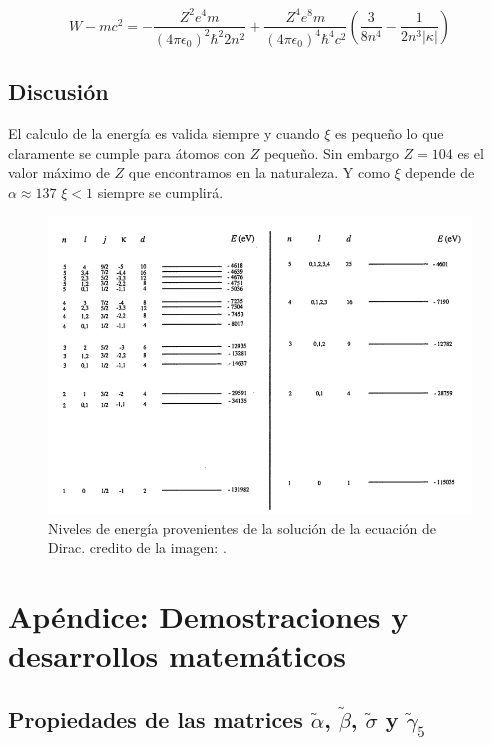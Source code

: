 \documentclass[a4paper, 12pt]{article} %
\begin{document}
\begin{equation}\label{eq:enerWfinal}
W-mc^2 = -\frac{Z^2e^4m}{(4\pi\epsilon_0)^2\hbar^2 2n^2}+\frac{Z^4e^8m}{(4\pi\epsilon_0)^4\hbar^4 c^2} \left( \frac{ 3}{8n^4}-\frac{1}{2n^3|\kappa|} \right)
\end{equation}


\subsection{Discusi\'on}

El calculo de la energ\'ia es valida siempre y cuando $\xi$ es peque\~no lo que claramente
se cumple para \'atomos con $Z$ peque\~no. Sin embargo $Z = 104 $ es el valor m\'aximo 
de $Z$ que encontramos en la naturaleza. Y como $\xi$ depende de $\alpha \approx 137$
$\xi<1$ siempre se cumplir\'a.  

\begin{figure}[H]
\centering
\includegraphics[scale=0.5]{relativistic.png}
\caption{Niveles de energ\'ia provenientes de la soluci\'on de la ecuaci\'on de Dirac.
credito de la imagen: \cite{strange}.}
\label{fig:relativistic}
\end{figure}


\section{Ap\'endice: Demostraciones y desarrollos matem\'aticos}\label{sec:apendice}

\subsection{Propiedades de las matrices $\widetilde{\alpha}$, $\widetilde{\beta}$,  
$\widetilde{\sigma}$ y $\widetilde{\gamma}_5$}\label{sec:gamma5}
\end{document}
